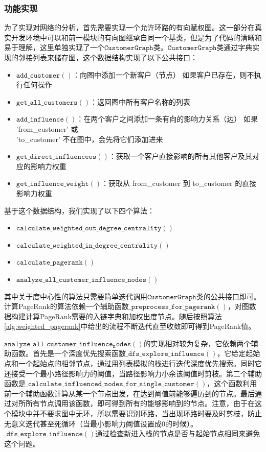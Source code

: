 \documentclass[cn,hazy,blue,10pt,normal]{elegantnote}
\begin{document}
\subsubsection{功能实现}
为了实现对网络的分析，首先需要实现一个允许环路的有向赋权图。这一部分在真实开发环境中可以和前一模块的有向图继承自同一个基类，但是为了代码的清晰和易于理解，这里单独实现了一个$\mathtt{CustomerGraph}$类。$\mathtt{CustomerGraph}$类通过字典实现的邻接列表来储存图，这个数据结构实现了以下公共接口：
\begin{itemize}
    \item $\mathtt{add\_customer()}$：向图中添加一个新客户（节点） 如果客户已存在，则不执行任何操作
    \item $\mathtt{get\_all\_customers()}$：返回图中所有客户名称的列表
    \item $\mathtt{add\_influence()}$：在两个客户之间添加一条有向的影响力关系（边） 
        如果 'from\_customer' 或 \\'to\_customer' 不在图中，会先将它们添加进来
    \item $\mathtt{get\_direct\_influencees()}$：获取一个客户直接影响的所有其他客户及其对应的影响力权重
    \item $\mathtt{get\_influence\_weight()}$：获取从 from\_customer 到 to\_customer 的直接影响力权重 
\end{itemize}

基于这个数据结构，我们实现了以下四个算法：
\begin{itemize}
    \item $\mathtt{calculate\_weighted\_out\_degree\_centrality()}$
    \item $\mathtt{calculate\_weighted\_in\_degree\_centrality()}$
    \item $\mathtt{calculate\_pagerank()}$
    \item $\mathtt{analyze\_all\_customer\_influence\_nodes()}$
\end{itemize}
其中关于度中心性的算法只需要简单迭代调用$\mathtt{CustomerGraph}$类的公共接口即可。计算PageRank的算法依赖一个辅助函数$\mathtt{\_preprocess\_for\_pagerank()}$，对图数据构建计算PageRank需要的入链字典和加权出度节点。随后按照算法\ref{alg:weighted_pagerank}中给出的流程不断迭代直至收敛即可得到PageRank值。

$\mathtt{analyze\_all\_customer\_influence_nodes()}$的实现相对较为复杂，它依赖两个辅助函数。首先是一个深度优先搜索函数$\mathtt{\_dfs\_explore\_influence()}$，它给定起始点和一个起始点的相邻节点，通过用列表模拟的栈进行迭代深度优先搜索。同时它还接受一个最小路径影响力的阈值，当路径影响力小余该阈值时剪枝。第二个辅助函数是$\mathtt{\_calculate\_influenced\_nodes\_for\_single\_customer()}$，这个函数利用前一个辅助函数计算从某一个节点出发，在达到阈值前能够遍历到的节点。最后通过对所所有节点调用该函数，即可得到所有的能够影响到的节点。注意，由于在这个模块中并不要求图中无环，所以需要识别环路，当出现环路时要及时剪枝，防止无意义迭代甚至死循环（当最小影响力阈值设置成$0$的时候）。$\mathtt{\_dfs\_explore\_influence()}$通过检查新进入栈的节点是否与起始节点相同来避免这个问题。
\end{document}
